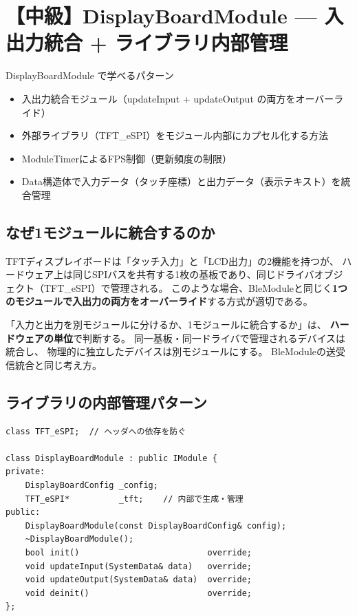 \section{【中級】DisplayBoardModule — 入出力統合 + ライブラリ内部管理}

\begin{patternbox}{DisplayBoardModule で学べるパターン}
\begin{itemize}
    \item 入出力統合モジュール（updateInput + updateOutput の両方をオーバーライド）
    \item 外部ライブラリ（TFT\_eSPI）をモジュール内部にカプセル化する方法
    \item ModuleTimerによるFPS制御（更新頻度の制限）
    \item Data構造体で入力データ（タッチ座標）と出力データ（表示テキスト）を統合管理
\end{itemize}
\end{patternbox}

\subsection{なぜ1モジュールに統合するのか}

TFTディスプレイボードは「タッチ入力」と「LCD出力」の2機能を持つが、
ハードウェア上は同じSPIバスを共有する1枚の基板であり、同じドライバオブジェクト（TFT\_eSPI）で管理される。
このような場合、BleModuleと同じく\textbf{1つのモジュールで入出力の両方をオーバーライド}する方式が適切である。

\begin{pointbox}[入出力統合の判断基準]
「入力と出力を別モジュールに分けるか、1モジュールに統合するか」は、
\textbf{ハードウェアの単位}で判断する。
同一基板・同一ドライバで管理されるデバイスは統合し、
物理的に独立したデバイスは別モジュールにする。
BleModuleの送受信統合と同じ考え方。
\end{pointbox}

\subsection{ライブラリの内部管理パターン}

\begin{lstlisting}[style=cppstyle, caption={DisplayBoardModule.h — TFT\_eSPIの前方宣言}]
class TFT_eSPI;  // ヘッダへの依存を防ぐ

class DisplayBoardModule : public IModule {
private:
    DisplayBoardConfig _config;
    TFT_eSPI*          _tft;    // 内部で生成・管理
public:
    DisplayBoardModule(const DisplayBoardConfig& config);
    ~DisplayBoardModule();
    bool init()                          override;
    void updateInput(SystemData& data)   override;
    void updateOutput(SystemData& data)  override;
    void deinit()                        override;
};
\end{lstlisting}

